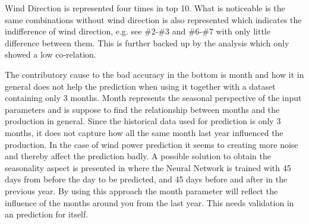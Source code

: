 Wind Direction is represented four times in top 10. What is noticeable is the same combinations without wind direction is also represented which indicates the indifference of wind direction, e.g. see \#2-\#3 and \#6-\#7 with only little difference between them. This is further backed up by the analysis which only showed a low co-relation. 

The contributory cause to the bad accuracy in the bottom is month and how it in general does not help the prediction when using it together with a dataset containing only 3 months. Month represents the seasonal perspective of the input parameters and is suppose to find the relationship between months and the production in general. Since the historical data used for prediction is only 3 months, it does not capture how all the same month last year influenced the production. In the case of wind power prediction it seems to creating more noise and thereby affect the prediction badly. A possible solution to obtain the seasonality aspect is presented in\cite{pjmForecast} where the Neural Network is trained with 45 days from before the day to be predicted, and 45 days before and after in the previous year. By using this approach the month parameter will reflect the influence of the months around you from the last year. This needs validation in an prediction for itself.


